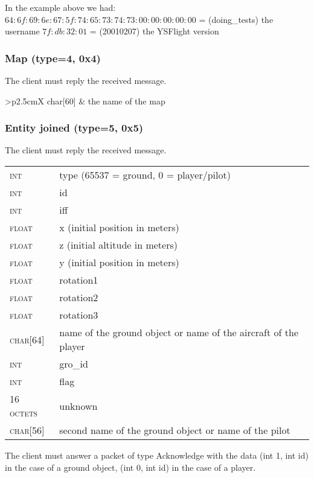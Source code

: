 \documentclass{article}
\newcommand{\gray}{\rowcolor[gray]{.92}}
\begin{document}
\vspace{0.3cm}
In the example above we had:\\
$64:6f:69:6e:67:5f:74:65:73:74:73:00:00:00:00:00$ = (doing\_tests) the username
$7f:db:32:01$ = (20010207) the YSFlight version

\vspace{0.4cm}
\subsubsection{Map (type=4, 0x4)}
The client must reply the received message.\\
\begin{tabularx}{\linewidth}{>{\raggedleft\scshape\small}p{2.5cm}X}
 char[60] & the name of the map\\
\end{tabularx}

\vspace{0.4cm}
\subsubsection{Entity joined (type=5, 0x5)}
The client must reply the received message.\\
\begin{tabularx}{\linewidth}{>{\raggedleft\scshape\small}p{2.5cm}X}
int &   type (65537 = ground, 0 = player/pilot)\\
\gray int &   id\\
int &   iff\\
\gray float & x (initial position in meters)\\
float & z (initial altitude in meters)\\
\gray float & y (initial position in meters)\\
float & rotation1\\
\gray float & rotation2\\
float & rotation3\\
\gray char[64] & name of the ground object or name of the aircraft of the player\\
int &   gro\_id\\
\gray int &   flag\\
16 octets &   unknown\\
\gray char[56] & second name of the ground object or name of the pilot\\
\end{tabularx}

\vspace{0.2cm}
The client must answer a packet of type Acknowledge with the data (int 1, int id) in the case of a ground object, (int 0, int id) in the case of a player.
\end{document}
